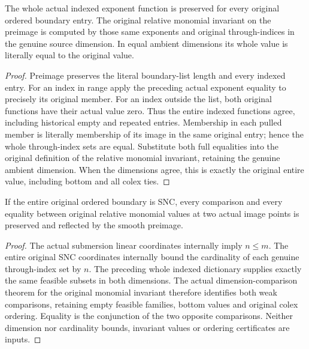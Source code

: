 \begin{theorem}
\label{hir:smooth-relative-monomial-whole-dictionary}
The whole actual indexed exponent function is preserved for every original
ordered boundary entry. The original relative monomial invariant on the
preimage is computed by those same exponents and original through-indices
in the genuine source dimension. In equal ambient dimensions its whole
value is literally equal to the original value.
\end{theorem}
\begin{proof}
Preimage preserves the literal boundary-list length and every indexed
entry. For an index in range apply the preceding actual exponent equality
to precisely its original member. For an index outside the list, both
original functions have their actual value zero. Thus the entire indexed
functions agree, including historical empty and repeated entries.
Membership in each pulled member is literally membership of its image in
the same original entry; hence the whole through-index sets are equal.
Substitute both full equalities into the original definition of the
relative monomial invariant, retaining the genuine ambient dimension.
When the dimensions agree, this is exactly the original entire value,
including bottom and all colex ties.
\end{proof}
\leanok

\begin{theorem}
\label{hir:smooth-relative-monomial-ordering}
If the entire original ordered boundary is SNC, every comparison and
every equality between original relative monomial values at two actual
image points is preserved and reflected by the smooth preimage.
\end{theorem}
\begin{proof}
The actual submersion linear coordinates internally imply $n\le m$.
The entire original SNC coordinates internally bound the cardinality of
each genuine through-index set by $n$. The preceding whole indexed
dictionary supplies exactly the same feasible subsets in both dimensions.
The actual dimension-comparison theorem for the original monomial
invariant therefore identifies both weak comparisons, retaining empty
feasible families, bottom values and original colex ordering. Equality is
the conjunction of the two opposite comparisons. Neither dimension nor
cardinality bounds, invariant values or ordering certificates are inputs.
\end{proof}
\leanok

